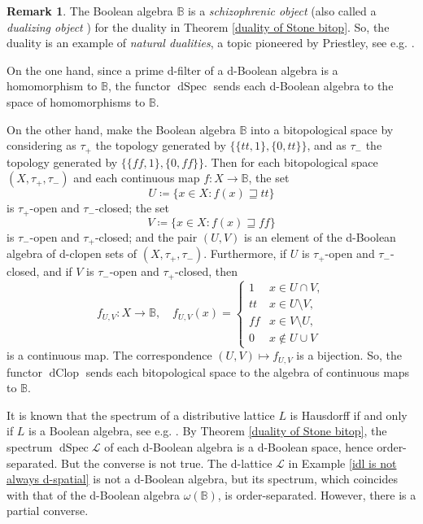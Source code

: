 \documentclass[11pt]{article}
\DeclareMathOperator{\dSpec}{dSpec}
\DeclareMathOperator{\dClop}{dClop}
\theoremstyle{plain}
\theoremstyle{definition}
\newtheorem{rem}[thm]{Remark}
\newcommand{\bbB}{\mathbb{B}}
\newcommand{\dbt}{{t\!t}}
\newcommand{\dbf}{{f\!\!f}}
\newcommand{\lra}{\longrightarrow}
\begin{document}
\begin{rem}\label{Stone-type} The Boolean algebra $\bbB$ is a \emph{schizophrenic object} \cite[Chapter VI]{Johnstone} (also called a \emph{dualizing object} \cite[page 14]{JM2006})  for the duality in Theorem \ref{duality of Stone bitop}. So, the duality is an example of \emph{natural dualities}, a topic pioneered by Priestley, see e.g. \cite{CD1998}.

On the one hand, since a prime d-filter of a d-Boolean algebra is a homomorphism to $\bbB$, the functor $\dSpec$ sends each d-Boolean algebra to the space of homomorphisms  to $\bbB$. 

On the other hand, make the Boolean algebra $\bbB$ into a bitopological space by considering as $\tau_+$ the topology generated by $\{\{\dbt,1\}, \{0,\dbt\}\}$, and as $\tau_-$ the topology generated by $\{\{\dbf,1\},\{0,\dbf\}\}$. Then for each bitopological space $(X,\tau_+,\tau_-)$ and each continuous map $f\colon X\lra \bbB$, the set $$U\coloneqq\{x\in X:f(x)\sqsupseteq\dbt\}$$ is $\tau_+$-open and $\tau_-$-closed; the set  $$V\coloneqq\{x\in X:f(x) \sqsupseteq\dbf\}$$ is $\tau_-$-open and $\tau_+$-closed; and the pair $(U,V)$ is an element of the d-Boolean algebra of d-clopen sets of $(X,\tau_+,\tau_-)$.   Furthermore, if $U$ is $\tau_+$-open and $\tau_-$-closed, and if $V$ is  $\tau_-$-open and $\tau_+$-closed, then  $$f_{U,V}\colon X\lra\bbB,\quad f_{U,V}(x)=\begin{cases}1 &x\in U\cap V, \\ \dbt &x\in U\setminus V,\\ \dbf & x\in V\setminus U,\\ 0 &x\notin U\cup V\end{cases}$$ is a continuous map. The correspondence $(U,V)\mapsto f_{U,V}$ is a bijection. So, the functor $\dClop$ sends each bitopological space to the algebra of continuous maps to $\bbB$. \end{rem} 
 
It is known that the spectrum of  a distributive lattice $L$ is Hausdorff if and only if $L$ is a Boolean algebra, see e.g. \cite[page 71]{Johnstone}. By Theorem \ref{duality of Stone bitop}, the spectrum $\dSpec\mathcal{L}$ of each d-Boolean algebra is a d-Boolean space,   hence order-separated. But the converse is not true. The d-lattice $\mathcal{L}$ in Example \ref{idl is not always d-spatial} is not a d-Boolean algebra, but its spectrum, which coincides with that of the d-Boolean algebra $\omega(\bbB)$, is   order-separated.  However, there is a partial converse.
\end{document}
